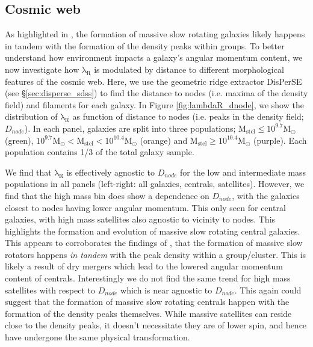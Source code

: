 \subsection{Cosmic web}
As highlighted in \citep{graham2019}, the formation of massive slow rotating galaxies likely happens in tandem with the formation of the density peaks within groups. To better understand how environment impacts a galaxy's angular momentum content, we now investigate how $\mathrm{\lambda_R}$ is modulated by distance to different morphological features of the cosmic web. Here, we use the geometric ridge extractor DisPerSE (see \S\ref{sec:disperse_sdss}) to find the distance to nodes (i.e. maxima of the density field) and filaments for each galaxy. In Figure \ref{fig:lambdaR_dnode}, we show the distribution of $\mathrm{\lambda_R}$ as function of distance to nodes (i.e. peaks in the density field; $D_{node}$). In each panel, galaxies are split into three populations; $\mathrm{M_{stel} \leq 10^{9.7}M_{\odot}}$ (green), $\mathrm{10^{9.7}M_{\odot} < M_{stel} < 10^{10.4}M_{\odot}}$ (orange) and $\mathrm{M_{stel} \geq 10^{10.4}M_{\odot}}$ (purple). Each population contains 1/3 of the total galaxy sample. 

We find that $\mathrm{\lambda_R}$ is effectively agnostic to $D_{node}$ for the low and intermediate mass populations in all panels (left-right: all galaxies, centrals, satellites). However, we find that the high mass bin does show a dependence on $D_{node}$, with the galaxies closest to nodes having lower angular momentum. This only seen for central galaxies, with high mass satellites also agnostic to vicinity to nodes. This highlights the formation and evolution of massive slow rotating central galaxies. This appears to corroborates the findings of \citet{graham2019}, that the formation of massive slow rotators happens \textit{in tandem} with the peak density within a group/cluster. This is likely a result of dry mergers which lead to the lowered angular momentum content of centrals. Interestingly we do not find the same trend for high mass satellites with respect to $D_{node}$ which is near agnostic to $D_{node}$. This again could suggest that the formation of massive slow rotating centrals happen with the formation of the density peaks themselves. While massive satellites can reside close to the density peaks, it doesn't necessitate they are of lower spin, and hence have undergone the same physical transformation.


